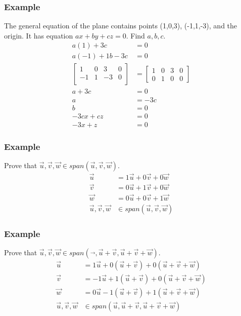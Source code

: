 \documentclass[letterpaper, 12pt]{math}
\begin{document}
\subsubsection*{Example}
The general equation of the plane contains points (1,0,3), (-1,1,-3), and the
origin. It has equation \( ax+by+cz = 0 \). Find \( a,b,c \).
\begin{align*}
  a(1)+3c &= 0 \\
  a(-1)+1b-3c &= 0 \\
  \left[\begin{array}{ccc|c}
    1 & 0 & 3 & 0 \\
    -1 & 1 & -3 & 0 \\
  \end{array}\right] &= \left[\begin{array}{ccc|c}
    1 & 0 & 3 & 0 \\
    0 & 1 & 0 & 0
  \end{array}\right] \\
  a+3c &= 0 \\
  a &= -3c \\
  b &= 0 \\
  -3cx+cz &= 0 \\
  -3x+z &= 0
\end{align*}

\subsubsection*{Example}
Prove that \( \vec{u},\vec{v},\vec{w}\in span(\vec{u},\vec{v},\vec{w}) \).
\begin{align*}
  \vec{u} &= 1\vec{u}+0\vec{v}+0\vec{w} \\
  \vec{v} &= 0\vec{u}+1\vec{v}+0\vec{w} \\
  \vec{w} &= 0\vec{u}+0\vec{v}+1\vec{w} \\
  \vec{u},\vec{v},\vec{w} &\in span(\vec{u},\vec{v},\vec{w})
\end{align*}

\subsubsection*{Example}
Prove that \( \vec{u},\vec{v},\vec{w}\in span(\vec{},\vec{u}+\vec{v},\vec{u}+
\vec{v}+\vec{w}) \).
\begin{align*}
  \vec{u} &= 1\vec{u}+0(\vec{u}+\vec{v})+0(\vec{u}+\vec{v}+\vec{w}) \\
  \vec{v} &= -1\vec{u}+1(\vec{u}+\vec{v})+0(\vec{u}+\vec{v}+\vec{w}) \\
  \vec{w} &= 0\vec{u}-1(\vec{u}+\vec{v})+1(\vec{u}+\vec{v}+\vec{w}) \\
  \vec{u},\vec{v},\vec{w} &\in
    span(\vec{u},\vec{u}+\vec{v},\vec{u}+\vec{v}+\vec{w})
\end{align*}
\end{document}
